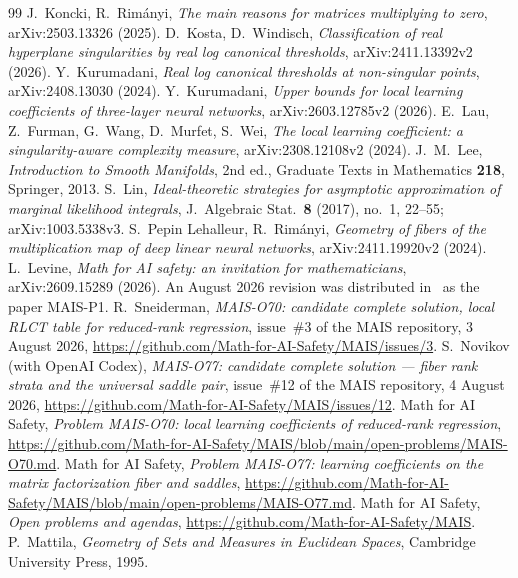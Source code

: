 \documentclass[11pt,a4paper]{article}
\theoremstyle{definition}
\theoremstyle{remark}
\numberwithin{equation}{section}
\begin{document}
\begin{thebibliography}{99}
 J.~Koncki, R.~Rimányi, \emph{The main reasons for matrices multiplying to zero}, arXiv:2503.13326 (2025).
 D.~Kosta, D.~Windisch, \emph{Classification of real hyperplane singularities by real log canonical thresholds}, arXiv:2411.13392v2 (2026).
 Y.~Kurumadani, \emph{Real log canonical thresholds at non-singular points}, arXiv:2408.13030 (2024).
 Y.~Kurumadani, \emph{Upper bounds for local learning coefficients of three-layer neural networks}, arXiv:2603.12785v2 (2026).
 E.~Lau, Z.~Furman, G.~Wang, D.~Murfet, S.~Wei, \emph{The local learning coefficient: a singularity-aware complexity measure}, arXiv:2308.12108v2 (2024).
 J.~M.~Lee, \emph{Introduction to Smooth Manifolds}, 2nd ed., Graduate Texts in Mathematics \textbf{218}, Springer, 2013.
 S.~Lin, \emph{Ideal-theoretic strategies for asymptotic approximation of marginal likelihood integrals}, J.\ Algebraic Stat.\ \textbf{8} (2017), no.\ 1, 22--55; arXiv:1003.5338v3.
 S.~Pepin Lehalleur, R.~Rimányi, \emph{Geometry of fibers of the multiplication map of deep linear neural networks}, arXiv:2411.19920v2 (2024).
 L.~Levine, \emph{Math for AI safety: an invitation for mathematicians}, arXiv:2609.15289 (2026). An August 2026 revision was distributed in~\cite{mais-repo} as the paper MAIS-P1.
 R.~Sneiderman, \emph{MAIS-O70: candidate complete solution, local RLCT table for reduced-rank regression}, issue~\#3 of the MAIS repository, 3 August 2026, \url{https://github.com/Math-for-AI-Safety/MAIS/issues/3}.
 S.~Novikov (with OpenAI Codex), \emph{MAIS-O77: candidate complete solution --- fiber rank strata and the universal saddle pair}, issue~\#12 of the MAIS repository, 4 August 2026, \url{https://github.com/Math-for-AI-Safety/MAIS/issues/12}.
 Math for AI Safety, \emph{Problem MAIS-O70: local learning coefficients of reduced-rank regression}, \url{https://github.com/Math-for-AI-Safety/MAIS/blob/main/open-problems/MAIS-O70.md}.
 Math for AI Safety, \emph{Problem MAIS-O77: learning coefficients on the matrix factorization fiber and saddles}, \url{https://github.com/Math-for-AI-Safety/MAIS/blob/main/open-problems/MAIS-O77.md}.
 Math for AI Safety, \emph{Open problems and agendas}, \url{https://github.com/Math-for-AI-Safety/MAIS}.
 P.~Mattila, \emph{Geometry of Sets and Measures in Euclidean Spaces}, Cambridge University Press, 1995.

\end{thebibliography}
\end{document}
